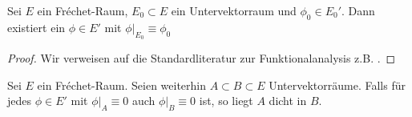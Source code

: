 \begin{thm}
  \label{thm:hahn-banach}
  Sei $E$ ein Fr\'echet-Raum, $E_0 \subset E$ ein Untervektorraum und
  $\phi_0 \in E_0'$. Dann existiert ein $\phi \in E'$ mit $\phi|_{E_0}
  \equiv \phi_0$
\end{thm}

\begin{proof}
  Wir verweisen auf die Standardliteratur zur Funktionalanalysis z.B. \cite[Satz3.6]{Rud}.
\end{proof}

\begin{cor}
  \label{cor:frechet-dicht}
  Sei $E$ ein Fr\'echet-Raum. Seien weiterhin $A \subset B \subset E$
  Untervektorräume. Falls für jedes $\phi \in E'$ mit $\phi|_A \equiv
  0$ auch $\phi|_B \equiv 0$ ist, so liegt $A$ dicht in $B$.
\end{cor}

